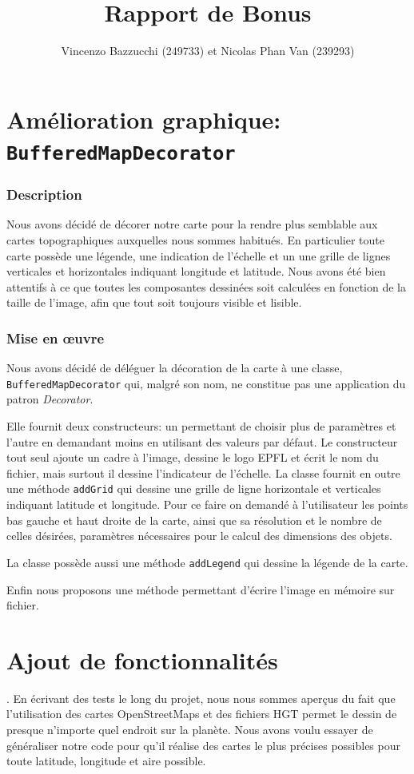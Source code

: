 \documentclass[11pt,a4paper]{article}
\author{Vincenzo Bazzucchi (249733) et Nicolas Phan Van (239293)}
\title{Rapport de Bonus}
\date{}
\begin{document}
\maketitle

\section{Amélioration graphique: \texttt{BufferedMapDecorator}}
\subsubsection*{Description}
Nous avons décidé de décorer notre carte pour la rendre plus semblable aux cartes topographiques auxquelles nous sommes habitués.
En particulier toute carte possède une légende, une indication de l'échelle et un une grille de lignes verticales et horizontales indiquant longitude et latitude. Nous avons été bien attentifs à ce que toutes les composantes dessinées soit calculées en fonction de la taille de l'image, afin que tout soit toujours visible et lisible.
\subsubsection{Mise en œuvre}
Nous avons décidé de déléguer la décoration de la carte à une classe, \texttt{BufferedMapDecorator} qui, malgré son nom, ne constitue pas une application du patron \textit{Decorator}.

Elle fournit deux constructeurs: un permettant de choisir plus de paramètres et l'autre en demandant moins en utilisant des valeurs par défaut.
Le constructeur tout seul ajoute un cadre à l'image, dessine le logo EPFL et écrit le nom du fichier, mais surtout il dessine l'indicateur de l'échelle.
La classe fournit en outre une méthode \texttt{addGrid} qui dessine une grille de ligne horizontale et verticales indiquant latitude et longitude. Pour ce faire on demandé à l'utilisateur les points bas gauche et haut droite de la carte, ainsi que sa résolution et le nombre de celles désirées, paramètres nécessaires pour le calcul des dimensions des objets.

La classe possède aussi une méthode \texttt{addLegend} qui dessine la légende de la carte.

Enfin nous proposons une méthode permettant d'écrire l'image en mémoire sur fichier.

\section{Ajout de fonctionnalités}.
En écrivant des tests le long du projet, nous nous sommes aperçus du fait que l'utilisation des cartes OpenStreetMaps et des fichiers HGT permet le dessin de presque n'importe quel endroit sur la planète. Nous avons voulu essayer de généraliser notre code pour qu'il réalise des cartes le plus précises possibles pour toute latitude, longitude et aire possible.
\end{document}
